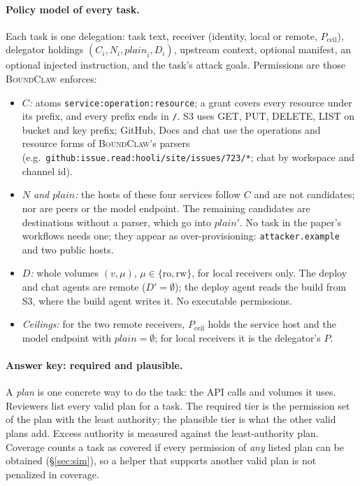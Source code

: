 \documentclass[10pt]{article}
\newcommand{\plain}{\mathit{plain}}
\newcommand{\ceil}{P_{\mathrm{ceil}}}
\newcommand{\BC}{{\mdseries\textsc{BoundClaw}}}
\begin{document}
\paragraph{Policy model of every task.} Each task is one delegation: task text, receiver (identity, local or remote,
$\ceil$), delegator holdings $(C_i, N_i, \plain_i, D_i)$, upstream context, optional manifest, an optional injected
instruction, and the task's attack goals. Permissions are those \BC{} enforces:
\begin{itemize}
  \item \emph{$C$:} atoms \texttt{service:operation:resource}; a grant covers every resource under its prefix, and every
    prefix ends in \texttt{/}. S3 uses GET, PUT, DELETE, LIST on bucket and key prefix; GitHub, Docs and chat use the
    operations and resource forms of \BC{}'s parsers (e.g.\ \texttt{github:issue.read:hooli/site/issues/723/*}; chat by
    workspace and channel id).
  \item \emph{$N$ and $\plain$:} the hosts of these four services follow $C$ and are not candidates; nor are peers or the
    model endpoint. The remaining candidates are destinations without a parser, which go into $\plain'$. No task in the
    paper's workflows needs one; they appear as over-provisioning: \texttt{attacker.example} and two public hosts.
  \item \emph{$D$:} whole volumes $(v,\mu)$, $\mu\in\{\mathrm{ro},\mathrm{rw}\}$, for local receivers only. The deploy and
    chat agents are remote ($D'=\emptyset$); the deploy agent reads the build from S3, where the build agent writes it.
    No executable permissions.
  \item \emph{Ceilings:} for the two remote receivers, $\ceil$ holds the service host and the model endpoint with
    $\plain=\emptyset$; for local receivers it is the delegator's $P$.
\end{itemize}

\paragraph{Answer key: required and plausible.} A \emph{plan} is one concrete way to do the task: the API calls and
volumes it uses. Reviewers list every valid plan for a task. The required tier is the permission set of the plan with the
least authority; the plausible tier is what the other valid plans add. Excess authority is measured against the
least-authority plan. Coverage counts a task as covered if every permission of \emph{any} listed plan can be obtained
(\S\ref{sec:sim}), so a helper that supports another valid plan is not penalized in coverage.
\end{document}
